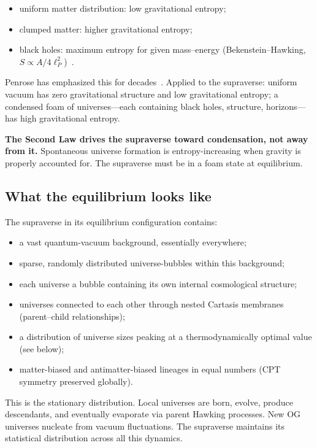 \begin{itemize}
  \item uniform matter distribution: low gravitational entropy;
  \item clumped matter: higher gravitational entropy;
  \item black holes: maximum entropy for given mass--energy
    (Bekenstein--Hawking, $S \propto A/4\ell_P^2$)~\citep{bekenstein1973}.
\end{itemize}

Penrose has emphasized this for decades~\citep{penrose1979}. Applied to the
supraverse: uniform vacuum has zero gravitational structure and low
gravitational entropy; a condensed foam of universes---each containing black
holes, structure, horizons---has high gravitational entropy.

\textbf{The Second Law drives the supraverse toward condensation, not away from
it.} Spontaneous universe formation is entropy-increasing when gravity is
properly accounted for. The supraverse must be in a foam state at equilibrium.

\subsection{What the equilibrium looks like}

The supraverse in its equilibrium configuration contains:

\begin{itemize}
  \item a vast quantum-vacuum background, essentially everywhere;
  \item sparse, randomly distributed universe-bubbles within this background;
  \item each universe a bubble containing its own internal cosmological structure;
  \item universes connected to each other through nested Cartasis membranes
    (parent--child relationships);
  \item a distribution of universe sizes peaking at a thermodynamically optimal
    value (see below);
  \item matter-biased and antimatter-biased lineages in equal numbers (CPT
    symmetry preserved globally).
\end{itemize}

This is the stationary distribution. Local universes are born, evolve, produce
descendants, and eventually evaporate via parent Hawking processes. New OG
universes nucleate from vacuum fluctuations. The supraverse maintains its
statistical distribution across all this dynamics.

